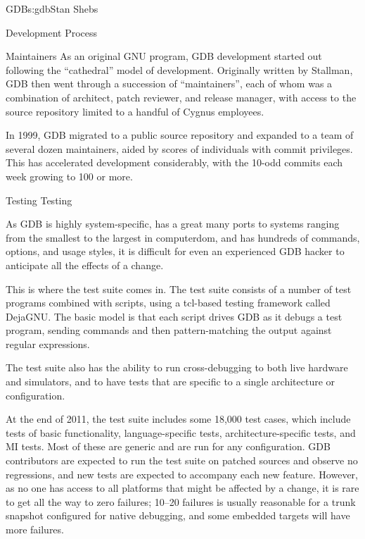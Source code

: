 \begin{aosachapter}{GDB}{s:gdb}{Stan Shebs}
\begin{aosasect1}{Development Process}
\begin{aosasect2}{Maintainers}
As an original GNU program, GDB development started out following the
``cathedral'' model of development.  Originally written by Stallman,
GDB then went through a succession of ``maintainers'', each of whom
was a combination of architect, patch reviewer, and release manager, with
access to the source repository limited to a handful of Cygnus
employees.

In 1999, GDB migrated to a public source repository and expanded to a
team of several dozen maintainers, aided by scores of individuals with
commit privileges.  This has accelerated development considerably,
with the 10-odd commits each week growing to 100 or more.

\end{aosasect2}

\begin{aosasect2}{Testing Testing}

As GDB is highly system-specific, has a great many
ports to systems ranging from the smallest to the largest in
computerdom, and has hundreds of commands, options, and usage
styles, it is difficult for even an experienced GDB hacker to
anticipate all the effects of a change.

This is where the test suite comes in.  The test suite consists of a
number of test programs combined with  scripts, using a
tcl-based testing framework called DejaGNU.  The basic model is that
each script drives GDB as it debugs a test program, sending commands and
then pattern-matching the output against regular expressions.

The test suite also has the ability to run cross-debugging to both live
hardware and simulators, and to have tests that are specific to a
single architecture or configuration.

At the end of 2011, the test suite includes some 18,000 test cases,
which include tests of basic functionality, language-specific tests,
architecture-specific tests, and MI tests.  Most of these are generic
and are run for any configuration.  GDB contributors are expected to
run the test suite on patched sources and observe no regressions, and
new tests are expected to accompany each new feature.
However, as no one has access to all platforms that might be affected
by a change, it is rare to get all the way to zero failures; 10--20
failures is usually reasonable for a trunk snapshot configured for
native debugging, and some embedded targets will have more failures.

\end{aosasect2}


\end{aosasect1}
\end{aosachapter}
